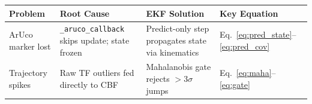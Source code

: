 \documentclass[12pt,a4paper]{article}
\begin{document}
\begin{center}
\begin{tabular}{@{}p{2.8cm}p{4cm}p{3.5cm}p{3.5cm}@{}}
\toprule
Problem & Root Cause & EKF Solution & Key Equation \\
\midrule
ArUco marker lost &
\texttt{\_aruco\_callback} skips update; state frozen &
Predict-only step propagates state via kinematics &
Eq.~\eqref{eq:pred_state}--\eqref{eq:pred_cov} \\[6pt]
Trajectory spikes &
Raw TF outliers fed directly to CBF &
Mahalanobis gate rejects $>3\sigma$ jumps &
Eq.~\eqref{eq:maha}--\eqref{eq:gate} \\
\bottomrule
\end{tabular}
\end{center}
\end{document}
